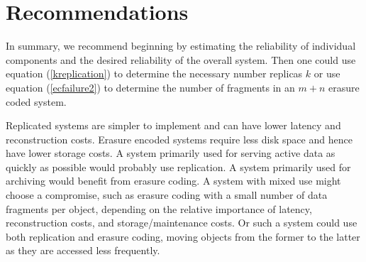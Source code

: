 \section{Recommendations}

In summary, we recommend beginning by estimating the reliability of individual components and the desired reliability of the overall system. Then one could use equation (\ref{kreplication}) to determine the necessary number replicas $k$ or use equation (\ref{ecfailure2}) to determine the number of fragments in an $m+n$ erasure coded system. 

Replicated systems are simpler to implement and can have lower latency and reconstruction costs. Erasure encoded systems require less disk space and hence have lower storage costs. A system primarily used for serving active data as quickly as possible would probably use replication. A system primarily used for archiving would benefit from erasure coding. A system with mixed use might choose a compromise, such as erasure coding with a small number of data fragments per object, depending on the relative importance of latency, reconstruction costs, and storage/maintenance costs. Or such a system could use both replication and erasure coding, moving objects from the former to the latter as they are accessed less frequently.


